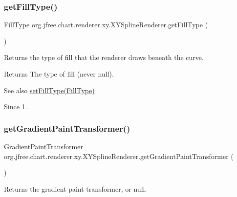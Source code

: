 \subsubsection{\texorpdfstring{get\+Fill\+Type()}{getFillType()}}
{\footnotesize\ttfamily Fill\+Type org.\+jfree.\+chart.\+renderer.\+xy.\+X\+Y\+Spline\+Renderer.\+get\+Fill\+Type (\begin{DoxyParamCaption}{ }\end{DoxyParamCaption})}

Returns the type of fill that the renderer draws beneath the curve.

\begin{DoxyReturn}{Returns}
The type of fill (never {\ttfamily null}).
\end{DoxyReturn}
\begin{DoxySeeAlso}{See also}
\mbox{\hyperlink{classorg_1_1jfree_1_1chart_1_1renderer_1_1xy_1_1_x_y_spline_renderer_a16c1c2cd076dc8d74b6c0aa24de3bdaa}{set\+Fill\+Type(\+Fill\+Type)}}
\end{DoxySeeAlso}
\begin{DoxySince}{Since}
1.. 
\end{DoxySince}
\mbox{\label{classorg_1_1jfree_1_1chart_1_1renderer_1_1xy_1_1_x_y_spline_renderer_ae16c4cea416913f19ce54d537ed4d341}} 
\subsubsection{\texorpdfstring{get\+Gradient\+Paint\+Transformer()}{getGradientPaintTransformer()}}
{\footnotesize\ttfamily Gradient\+Paint\+Transformer org.\+jfree.\+chart.\+renderer.\+xy.\+X\+Y\+Spline\+Renderer.\+get\+Gradient\+Paint\+Transformer (\begin{DoxyParamCaption}{ }\end{DoxyParamCaption})}

Returns the gradient paint transformer, or {\ttfamily null}.

